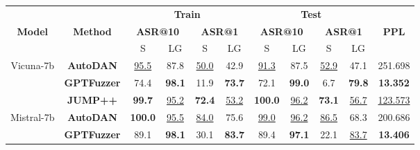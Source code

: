 \renewcommand{\arraystretch}{1.5}
\setlength{\tabcolsep}{5pt} %
\captionsetup[table]{justification=raggedright, singlelinecheck=false}
\begin{table*}[!t]
    \centering
    \small
    \begin{tabular}{ccccccccccc}  %
        \hline
         &  & \multicolumn{4}{c}{\textbf{Train}} & \multicolumn{4}{c}{\textbf{Test}} & \textbf{} \\
        \cline{3-6} \cline{7-10} 
        \textbf{Model} & \textbf{Method} & \multicolumn{2}{c}{\textbf{ASR@10}} & \multicolumn{2}{c}{\textbf{ASR@1}} & \multicolumn{2}{c}{\textbf{ASR@10}} & \multicolumn{2}{c}{\textbf{ASR@1}} & \textbf{PPL} \\
        \cline{3-4} \cline{5-6} \cline{7-8} \cline{9-10} 
         &  & S & LG & S & LG & S & LG & S & LG &  \\
        \hline
        \multirow{3}{*}{Vicuna-7b} 
            & \textbf{AutoDAN} & \underline{95.5} & 87.8 & \underline{50.0} & 42.9 & \underline{91.3} & 87.5 & \underline{52.9} & 47.1 & 251.698 \\
            & \textbf{GPTFuzzer} & 74.4 & \textbf{98.1} & 11.9 & \textbf{73.7} & 72.1 & \textbf{99.0} & 6.7 & \textbf{79.8} & \textbf{13.352} \\
            & \textbf{JUMP++} & \textbf{99.7} & \underline{95.2} & \textbf{72.4} & \underline{53.2} & \textbf{100.0} & \underline{96.2} & \textbf{73.1} & \underline{56.7} & \underline{123.573} \\
        \hline
        \multirow{3}{*}{Mistral-7b} 
            & \textbf{AutoDAN} & \textbf{100.0} & \underline{95.5} & \underline{84.0} & 75.6  & \underline{99.0} & \underline{96.2} & \underline{86.5} & 68.3 & 200.686 \\
            & \textbf{GPTFuzzer} & 89.1 & \textbf{98.1} & 30.1 & \textbf{83.7} & 89.4 & \textbf{97.1} & 22.1 & \underline{83.7} & \textbf{13.406} \\

\end{tabular}
\end{table*}
